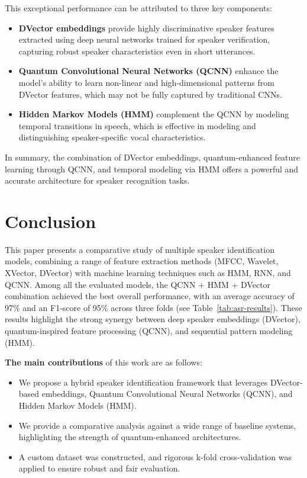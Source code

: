\documentclass[conference]{IEEEtran}
\begin{document}
This exceptional performance can be attributed to three key components:
\begin{itemize}
    \item \textbf{DVector embeddings} provide highly discriminative speaker features extracted using deep neural networks trained for speaker verification, capturing robust speaker characteristics even in short utterances.
    \item \textbf{Quantum Convolutional Neural Networks (QCNN)} enhance the model’s ability to learn non-linear and high-dimensional patterns from DVector features, which may not be fully captured by traditional CNNs.
    \item \textbf{Hidden Markov Models (HMM)} complement the QCNN by modeling temporal transitions in speech, which is effective in modeling and distinguishing speaker-specific vocal characteristics.
\end{itemize}

In summary, the combination of DVector embeddings, quantum-enhanced feature learning through QCNN, and temporal modeling via HMM offers a powerful and accurate architecture for speaker recognition tasks.

\section{Conclusion}

This paper presents a comparative study of multiple speaker identification models, combining a range of feature extraction methods (MFCC, Wavelet, XVector, DVector) with machine learning techniques such as HMM, RNN, and QCNN. Among all the evaluated models, the QCNN + HMM + DVector combination achieved the best overall performance, with an average accuracy of 97\% and an F1-score of 95\% across three folds (see Table~\ref{tab:asr-results}). These results highlight the strong synergy between deep speaker embeddings (DVector), quantum-inspired feature processing (QCNN), and sequential pattern modeling (HMM).

\textbf{The main contributions} of this work are as follows:
\begin{itemize}
    \item We propose a hybrid speaker identification framework that leverages DVector-based embeddings, Quantum Convolutional Neural Networks (QCNN), and Hidden Markov Models (HMM).
    \item We provide a comparative analysis against a wide range of baseline systems, highlighting the strength of quantum-enhanced architectures.
    \item A custom dataset was constructed, and rigorous k-fold cross-validation was applied to ensure robust and fair evaluation.
\end{itemize}
\end{document}
